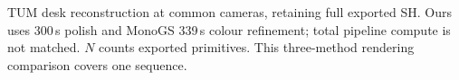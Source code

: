 \begin{table}[t]
\centering\small
\setlength{\tabcolsep}{4pt}

\caption[Rendering on TUM \texttt{fr1\_desk}]{TUM desk reconstruction at
common cameras, retaining full exported SH. Ours uses 300\,s polish and
MonoGS 339\,s colour refinement; total pipeline compute is not matched.
$N$ counts exported primitives. This three-method rendering comparison
covers one sequence.}
\label{tab:tum}
\end{table}
